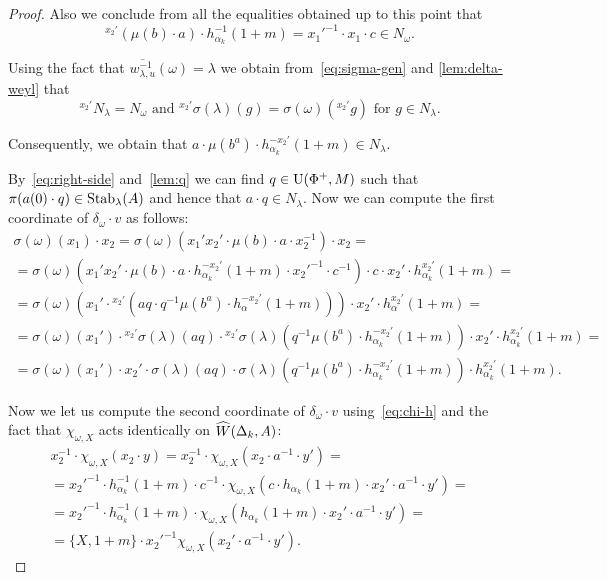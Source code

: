\begin{proof}
 Also we conclude from all the equalities obtained up to this point that
 \begin{equation} {}^{x_2'}(\mu(b) \cdot a) \cdot h_{\alpha_k}^{-1}(1+m) = {x_1'}^{-1} \cdot x_1 \cdot c \in N_\omega. \end{equation}

 Using the fact that $\overline{w_{\lambda, u}^{-1}}(\omega) = \lambda$
  we obtain from~\eqref{eq:sigma-gen} and \cref{lem:delta-weyl} that
 \begin{equation} \label{eq:delta-weyl-x2prime} {}^{x_2'}N_\lambda = N_\omega\text{ and } {}^{x_2'}\sigma(\lambda)(g) = \sigma(\omega)({}^{x_2'}g)\text{ for } g\in N_\lambda.\end{equation}

 Consequently, we obtain that
  $a \cdot \mu(b^a) \cdot h_{\alpha_k}^{-{x_2'}}(1+m) \in {N_{\lambda}}$.

 By~\eqref{eq:right-side} and~\cref{lem:q} we can find $q \in \operatorname{U}(\Phi^+, M)$ such that $\pi(a(0) \cdot q) \in \operatorname{Stab}_\lambda(A)$ and hence
     that $a \cdot q \in N_\lambda$.
 Now we can compute the first coordinate of $\delta_\omega \cdot v$ as follows:
 \begin{multline} \label{eq:intermediate}
  \sigma(\omega)(x_1) \cdot x_2 = \sigma(\omega)(x_1'x_2' \cdot \mu(b) \cdot a \cdot x_2^{-1}) \cdot x_2 = \\
   = \sigma(\omega)(x_1'x_2' \cdot \mu(b) \cdot a \cdot h^{-{x_2'}}_{\alpha_k}(1+m) \cdot {x_2'}^{-1} \cdot c^{-1}) \cdot c \cdot x_2' \cdot h_{\alpha_k}^{x_2'}(1+m) = \\
   = \sigma(\omega)\left(x_1'\cdot {}^{x_2'} (aq \cdot q^{-1} \mu(b^a) \cdot h^{-x_2'}_\alpha(1+m))\right) \cdot x_2' \cdot h_{\alpha}^{x_2'}(1+m) = \\
   = \sigma(\omega)(x_1') \cdot {}^{x_2'}\sigma(\lambda)(aq) \cdot {}^{x_2'}\sigma(\lambda)(q^{-1} \mu(b^a) \cdot h^{-x_2'}_{\alpha_k}(1+m)) \cdot x_2' \cdot h^{x_2'}_{\alpha_k}(1+m) = \\
   = \sigma(\omega)(x_1') \cdot x_2' \cdot \sigma(\lambda)(aq) \cdot \sigma(\lambda)\left(q^{-1} \mu(b^a) \cdot h^{-x_2'}_{\alpha_k}(1+m)\right) \cdot h^{x_2'}_{\alpha_k}(1+m).
 \end{multline}

 Now we let us compute the second coordinate of $\delta_\omega \cdot v$ using~\eqref{eq:chi-h} and the fact that
 $\chi_{\omega, X}$ acts identically on $\widehat{W}(\Delta_k, A)$:
 \begin{multline}\label{eq:intermediate2}
 x_2^{-1}\cdot \chi_{\omega, X}(x_2 \cdot y) = x_2^{-1} \cdot \chi_{\omega, X}(x_2 \cdot a^{-1} \cdot y') = \\
 = {x_2'}^{-1} \cdot h_{\alpha_k}^{-1}(1 + m) \cdot c^{-1} \cdot \chi_{\omega, X}(c \cdot h_{\alpha_k}(1 + m) \cdot x_2' \cdot a^{-1} \cdot y') = \\
 = {x_2'}^{-1} \cdot h_{\alpha_k}^{-1}(1 + m) \cdot \chi_{\omega, X}(h_{\alpha_k}(1 + m) \cdot x_2' \cdot a^{-1} \cdot y') = \\
 = \{X, 1+m\} \cdot {x_2'}^{-1} \chi_{\omega, X}(x_2' \cdot a^{-1} \cdot y').
 \end{multline}


\end{proof}
